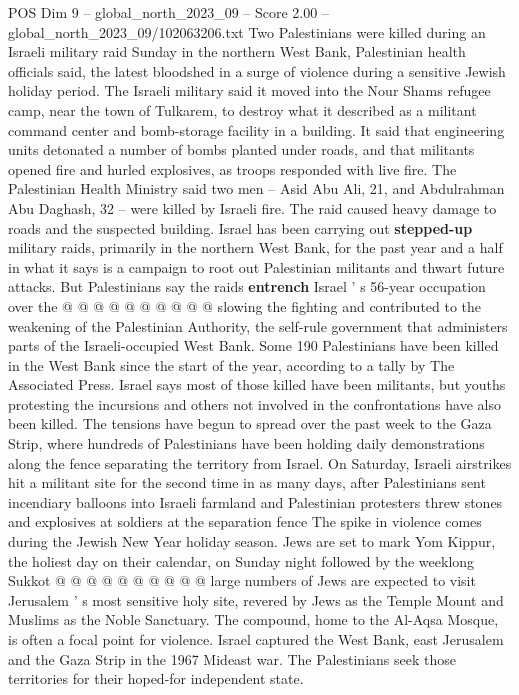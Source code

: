 \begin{textsample}{POS Dim 9 – global\_north\_2023\_09 – Score 2.00 – global\_north\_2023\_09/102063206.txt}  \label{ex:f9_pos_008}
Two Palestinians were killed during an Israeli military raid Sunday in the northern West Bank, Palestinian health officials said, the latest bloodshed in a surge of violence during a sensitive Jewish holiday period.
The Israeli military said it moved into the Nour Shams refugee camp, near the town of Tulkarem, to destroy what it described as a militant command center and bomb-storage facility in a building.
It said that engineering units detonated a number of bombs planted under roads, and that militants opened fire and hurled explosives, as troops responded with live fire.
The Palestinian Health Ministry said two men -- Asid Abu Ali, 21, and Abdulrahman Abu Daghash, 32 -- were killed by Israeli fire.
The raid caused heavy damage to roads and the suspected building.
Israel has been carrying out \textbf{stepped-up} military raids, primarily in the northern West Bank, for the past year and a half in what it says is a campaign to root out Palestinian militants and thwart future attacks.
But Palestinians say the raids \textbf{entrench} Israel ' s 56-year occupation over the @ @ @ @ @ @ @ @ @ @ slowing the fighting and contributed to the weakening of the Palestinian Authority, the self-rule government that administers parts of the Israeli-occupied West Bank.
Some 190 Palestinians have been killed in the West Bank since the start of the year, according to a tally by The Associated Press.
Israel says most of those killed have been militants, but youths protesting the incursions and others not involved in the confrontations have also been killed.
The tensions have begun to spread over the past week to the Gaza Strip, where hundreds of Palestinians have been holding daily demonstrations along the fence separating the territory from Israel.
On Saturday, Israeli airstrikes hit a militant site for the second time in as many days, after Palestinians sent incendiary balloons into Israeli farmland and Palestinian protesters threw stones and explosives at soldiers at the separation fence The spike in violence comes during the Jewish New Year holiday season.
Jews are set to mark Yom Kippur, the holiest day on their calendar, on Sunday night followed by the weeklong Sukkot @ @ @ @ @ @ @ @ @ @ large numbers of Jews are expected to visit Jerusalem ' s most sensitive holy site, revered by Jews as the Temple Mount and Muslims as the Noble Sanctuary.
The compound, home to the Al-Aqsa Mosque, is often a focal point for violence.
Israel captured the West Bank, east Jerusalem and the Gaza Strip in the 1967 Mideast war.
The Palestinians seek those territories for their hoped-for independent state.

\end{textsample}
